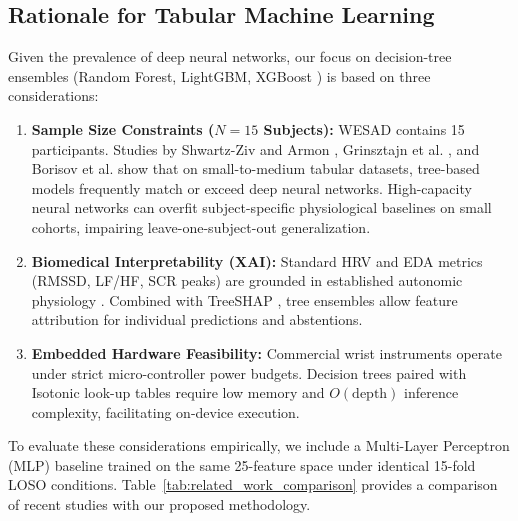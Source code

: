 \documentclass[conference]{IEEEtran}
\begin{document}
\subsection{Rationale for Tabular Machine Learning}
Given the prevalence of deep neural networks, our focus on decision-tree ensembles (Random Forest, LightGBM, XGBoost \cite{chen2016xgboost}) is based on three considerations:
\begin{enumerate}
    \item \textbf{Sample Size Constraints ($N=15$ Subjects):} WESAD contains 15 participants. Studies by Shwartz-Ziv and Armon \cite{shwartzziv2022tabular}, Grinsztajn et al. \cite{grinsztajn2022why}, and Borisov et al. \cite{borisov2024deep} show that on small-to-medium tabular datasets, tree-based models frequently match or exceed deep neural networks. High-capacity neural networks can overfit subject-specific physiological baselines on small cohorts, impairing leave-one-subject-out generalization.
    \item \textbf{Biomedical Interpretability (XAI):} Standard HRV and EDA metrics (RMSSD, LF/HF, SCR peaks) are grounded in established autonomic physiology \cite{taskforce1996heart, greco2016cvxeda, tarvainen2014kubios}. Combined with TreeSHAP \cite{lundberg2017unified}, tree ensembles allow feature attribution for individual predictions and abstentions.
    \item \textbf{Embedded Hardware Feasibility:} Commercial wrist instruments operate under strict micro-controller power budgets. Decision trees paired with Isotonic look-up tables require low memory and $O(\text{depth})$ inference complexity, facilitating on-device execution.
\end{enumerate}

To evaluate these considerations empirically, we include a Multi-Layer Perceptron (MLP) baseline trained on the same 25-feature space under identical 15-fold LOSO conditions. Table~\ref{tab:related_work_comparison} provides a comparison of recent studies with our proposed methodology.
\end{document}

